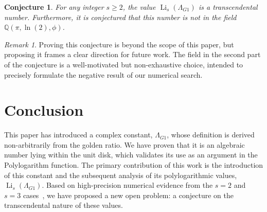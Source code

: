 \documentclass{amsart}
\theoremstyle{plain}
\newtheorem{conjecture}[theorem]{Conjecture}
\theoremstyle{definition}
\theoremstyle{remark}
\newtheorem*{remark}{Remark}
\DeclareMathOperator{\Li}{Li}
\newcommand{\LambdaG}{\Lambda_{G1}}
\newcommand{\phiG}{\phi}
\begin{document}
\begin{conjecture}
For any integer $s \ge 2$, the value $\Li_s(\LambdaG)$ is a transcendental number. Furthermore, it is conjectured that this number is not in the field $\mathbb{Q}(\pi, \ln(2), \phiG)$.
\end{conjecture}

\begin{remark}
Proving this conjecture is beyond the scope of this paper, but proposing it frames a clear direction for future work. The field in the second part of the conjecture is a well-motivated but non-exhaustive choice, intended to precisely formulate the negative result of our numerical search.
\end{remark}

\section{Conclusion}
This paper has introduced a complex constant, $\LambdaG$, whose definition is derived non-arbitrarily from the golden ratio. We have proven that it is an algebraic number lying within the unit disk, which validates its use as an argument in the Polylogarithm function. The primary contribution of this work is the introduction of this constant and the subsequent analysis of its polylogarithmic values, $\Li_s(\LambdaG)$. Based on high-precision numerical evidence from the $s=2$ and $s=3$ cases~\cite{mpmath}, we have proposed a new open problem: a conjecture on the transcendental nature of these values.

\end{document}
